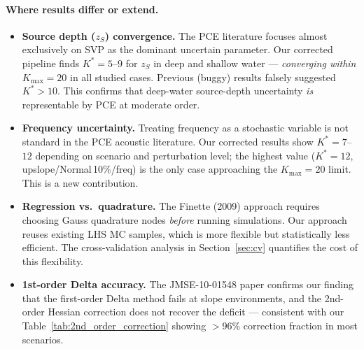 \documentclass[11pt,a4paper]{article}
\begin{document}
\paragraph{Where results differ or extend.}
\begin{itemize}
  \item \textbf{Source depth ($z_S$) convergence.} The PCE literature focuses almost
        exclusively on SVP as the dominant uncertain parameter.  Our corrected pipeline
        finds $K^* = 5$--$9$ for $z_S$ in deep and shallow water --- \emph{converging
        within} $K_{\max}=20$ in all studied cases.  Previous (buggy) results falsely
        suggested $K^* > 10$.  This confirms that deep-water source-depth uncertainty
        \emph{is} representable by PCE at moderate order.
  \item \textbf{Frequency uncertainty.} Treating frequency as a stochastic variable
        is not standard in the PCE acoustic literature.  Our corrected results show
        $K^* = 7$--$12$ depending on scenario and perturbation level; the highest
        value ($K^*=12$, upslope/Normal\,10\%/freq) is the only case approaching the
        $K_{\max}=20$ limit.  This is a new contribution.
  \item \textbf{Regression vs.\ quadrature.} The Finette (2009) approach requires
        choosing Gauss quadrature nodes \emph{before} running simulations.  Our
        approach reuses existing LHS MC samples, which is more flexible but
        statistically less efficient.  The cross-validation analysis in
        Section~\ref{sec:cv} quantifies the cost of this flexibility.
  \item \textbf{1st-order Delta accuracy.}  The JMSE-10-01548 paper confirms our
        finding that the first-order Delta method fails at slope environments, and
        the 2nd-order Hessian correction does not recover the deficit — consistent
        with our Table~\ref{tab:2nd_order_correction} showing $>$96\% correction
        fraction in most scenarios.
\end{itemize}
\end{document}
